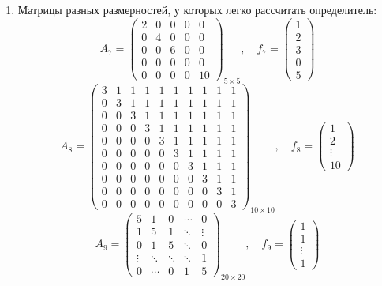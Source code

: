 \begin{enumerate}
  \item Матрицы разных размерностей, у которых легко рассчитать определитель:
  \[
    A_7=\begin{pmatrix} 2 & 0 & 0 & 0 & 0 \\ 0 & 4 & 0 & 0 & 0 \\ 0 & 0 & 6 & 0 & 0 \\ 0 & 0 & 0 & 0 & 0 \\ 0 & 0 & 0 & 0 & 10 \end{pmatrix}_{5 \times 5}, \quad f_7=\begin{pmatrix} 1 \\ 2 \\ 3 \\ 0 \\ 5 \end{pmatrix}
  \]
  \[
    A_8=\begin{pmatrix} 3 & 1 & 1 & 1 & 1 & 1 & 1 & 1 & 1 & 1 \\ 0 & 3 & 1 & 1 & 1 & 1 & 1 & 1 & 1 & 1 \\ 0 & 0 & 3 & 1 & 1 & 1 & 1 & 1 & 1 & 1 \\ 0 & 0 & 0 & 3 & 1 & 1 & 1 & 1 & 1 & 1 \\ 0 & 0 & 0 & 0 & 3 & 1 & 1 & 1 & 1 & 1 \\ 0 & 0 & 0 & 0 & 0 & 3 & 1 & 1 & 1 & 1 \\ 0 & 0 & 0 & 0 & 0 & 0 & 3 & 1 & 1 & 1 \\ 0 & 0 & 0 & 0 & 0 & 0 & 0 & 3 & 1 & 1 \\ 0 & 0 & 0 & 0 & 0 & 0 & 0 & 0 & 3 & 1 \\ 0 & 0 & 0 & 0 & 0 & 0 & 0 & 0 & 0 & 3 \end{pmatrix}_{10 \times 10}, \quad f_8=\begin{pmatrix} 1 \\ 2 \\ \vdots \\ 10 \end{pmatrix}
  \]
  \[
    A_9=\begin{pmatrix} 5 & 1 & 0 & \cdots & 0 \\ 1 & 5 & 1 & \ddots & \vdots \\ 0 & 1 & 5 & \ddots & 0 \\ \vdots & \ddots & \ddots & \ddots & 1 \\ 0 & \cdots & 0 & 1 & 5 \end{pmatrix}_{20 \times 20}, \quad f_9=\begin{pmatrix} 1 \\ 1 \\ \vdots \\ 1 \end{pmatrix}
  \]
\end{enumerate}

